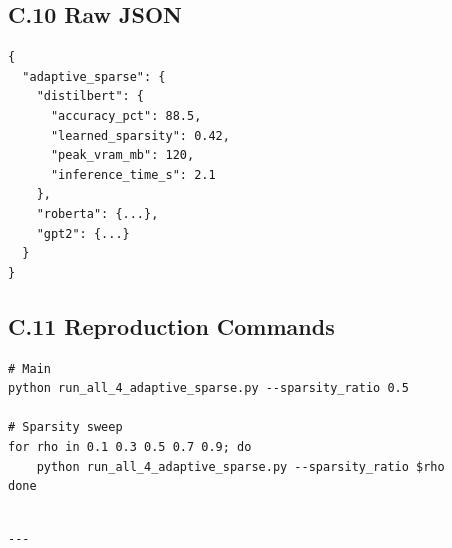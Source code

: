 \subsection{C.10 Raw JSON}

\begin{lstlisting}
{
  "adaptive_sparse": {
    "distilbert": {
      "accuracy_pct": 88.5,
      "learned_sparsity": 0.42,
      "peak_vram_mb": 120,
      "inference_time_s": 2.1
    },
    "roberta": {...},
    "gpt2": {...}
  }
}
\end{lstlisting}

\subsection{C.11 Reproduction Commands}

\begin{lstlisting}
# Main
python run_all_4_adaptive_sparse.py --sparsity_ratio 0.5

# Sparsity sweep
for rho in 0.1 0.3 0.5 0.7 0.9; do
    python run_all_4_adaptive_sparse.py --sparsity_ratio $rho
done
\end{lstlisting}
\begin{lstlisting}

---
\end{lstlisting}